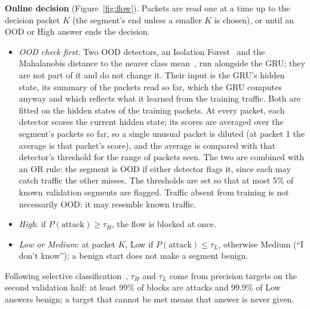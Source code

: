 \documentclass[11pt]{article}
\begin{document}
\textbf{Online decision} (Figure~\ref{fig:flow}). Packets are read one at a time up to the decision packet $K$ (the
segment's end unless a smaller $K$ is chosen), or until an OOD or High answer ends the decision.
\begin{itemize}
\item \emph{OOD check first.} Two OOD detectors, an Isolation Forest~\cite{iforest} and the Mahalanobis distance to
the nearer class mean~\cite{mahalanobis}, run alongside the GRU; they are not part of it and do not change it. Their
input is the GRU's hidden state, its summary of the packets read so far, which the GRU computes anyway and which
reflects what it learned from the training traffic. Both are fitted on the hidden states of the training packets.
At every packet, each detector scores the current hidden state; its scores are averaged over the segment's packets so
far, so a single unusual packet is diluted (at packet 1 the average is that packet's score), and the average is
compared with that detector's threshold for the range of packets seen. The two are combined with an OR rule: the
segment is OOD if either detector flags it, since each may catch traffic the other misses. The thresholds are set so
that at most 5\% of known validation segments are flagged. Traffic absent from training is not necessarily OOD: it may
resemble known traffic.
\item \emph{High}: if $P(\text{attack})\ge\tau_H$, the flow is blocked at once.
\item \emph{Low or Medium}: at packet $K$, Low if $P(\text{attack})\le\tau_L$, otherwise Medium (``I don't know''); a
benign start does not make a segment benign.
\end{itemize}
Following selective classification~\cite{selective}, $\tau_H$ and $\tau_L$ come from precision targets on the second
validation half: at least 99\% of blocks are attacks and 99.9\% of Low answers benign; a target that cannot be met means
that answer is never given.
\end{document}
